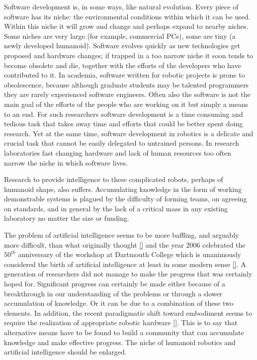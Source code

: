 Software development is, in some ways, like natural 
evolution.  Every piece of software has its niche:
the environmental conditions within which it can be
used.  Within this niche it will grow and change and 
perhaps expand to nearby niches.
Some niches are very large (for example, commercial PCs), some are
tiny (a newly developed humanoid). Software evolves quickly 
as new technologies get proposed and hardware changes; if trapped 
in a too narrow niche it soon tends to become obsolete and die, 
together with the efforts of the developers who have contributed 
to it. In academia, software written for robotic 
projects is prone to obsolescence, 
because although graduate students may be 
talented programmers they are rarely
experienced software engineers.
Often also the software is not the main goal of the 
efforts of the people who are working on it but
simply a means to an end.
For such researchers 
software development is a time consuming and tedious task that 
takes away time and efforts that could be better spent doing 
research. Yet at the same time, software development in 
robotics is a delicate and crucial task that cannot be easily 
delegated to untrained persons. In research laboratories 
fast changing hardware and lack of human resources too often 
narrow the niche in which software lives.

%
Research to provide intelligence to these complicated robots, perhaps
of humanoid shape, also suffers. Accumulating knowledge 
in the form of working demonstrable systems is plagued by the   
difficulty of forming teams, on agreeing on standards, and in 
general by the lack of a critical mass in any existing laboratory no 
matter the size or funding. 

The problem of artificial intelligence seems to be more baffling, and 
arguably more difficult, than what originally thought \ref{} and the year 2006 
celebrated the $50^{th}$ anniversary of the workshop at Dartmouth College
which is unanimously considered the birth of artificial intelligence at 
least in some modern sense \ref{}. %
A generation of researchers did not manage to make the progress that was
certainly hoped for. Significant progress can certainly be made either 
because of a breakthrough in our understanding of the problems or through 
a slower accumulation of knowledge. Or it can be due to a combination of 
these two elements. In addition, the recent paradigmatic shift toward embodiment 
seems to require the realization of appropriate robotic hardware \ref{}. 
This is to say that alternative means have to be found to build a community
that can accumulate knowledge and make effective progress. The niche of
humanoid robotics and artificial intelligence should be enlarged.

